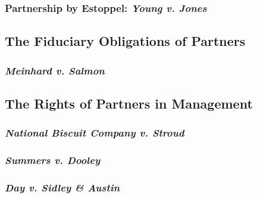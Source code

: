 
\subsubsection{Partnership by Estoppel: \emph{Young v. Jones}}


\subsection{The Fiduciary Obligations of Partners}

\subsubsection{\emph{Meinhard v. Salmon}}


\subsection{The Rights of Partners in Management}

\subsubsection{\emph{National Biscuit Company v. Stroud}}


\subsubsection{\emph{Summers v. Dooley}}


\subsubsection{\emph{Day v. Sidley \& Austin}}


